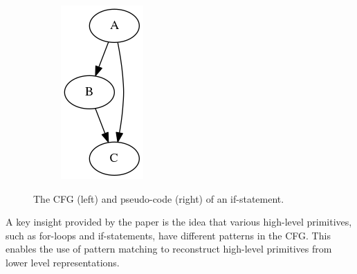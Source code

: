 \documentclass[12pt, a4paper]{article}
\begin{document}
\begin{figure}[H]
   \centering
   \begin{subfigure}[b]{0.15\textwidth}
      \includegraphics[width=\textwidth]{inc/if.png}
   \end{subfigure}
   \qquad
   \begin{subfigure}[b]{0.2\textwidth}
      
   \end{subfigure}
   \caption{The CFG (left) and pseudo-code (right) of an if-statement.}
\end{figure}

A key insight provided by the paper is the idea that various high-level primitives, such as for-loops and if-statements, have different patterns in the CFG. This enables the use of pattern matching to reconstruct high-level primitives from lower level representations.


\end{document}

